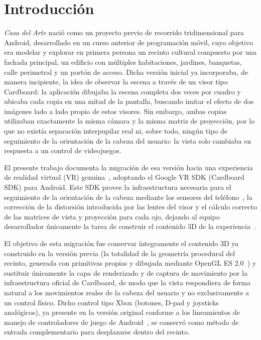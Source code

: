 \documentclass[conference]{IEEEtran}
\begin{document}
	\section{Introducción}
	\textit{Casa del Arte} nació como un proyecto previo de recorrido tridimensional para Android, desarrollado en un curso anterior de programación móvil, cuyo objetivo era modelar y explorar en primera persona un recinto cultural compuesto por una fachada principal, un edificio con múltiples habitaciones, jardines, banquetas, calle perimetral y un portón de acceso. Dicha versión inicial ya incorporaba, de manera incipiente, la idea de observar la escena a través de un visor tipo Cardboard: la aplicación dibujaba la escena completa dos veces por cuadro y ubicaba cada copia en una mitad de la pantalla, buscando imitar el efecto de dos imágenes lado a lado propio de estos visores. Sin embargo, ambas copias utilizaban exactamente la misma cámara y la misma matriz de proyección, por lo que no existía separación interpupilar real ni, sobre todo, ningún tipo de seguimiento de la orientación de la cabeza del usuario: la vista solo cambiaba en respuesta a un control de videojuegos.
	
	El presente trabajo documenta la migración de esa versión hacia una experiencia de realidad virtual (VR) genuina~\cite{sherman2018understanding}, adoptando el Google VR SDK (Cardboard SDK) para Android. Este SDK provee la infraestructura necesaria para el seguimiento de la orientación de la cabeza mediante los sensores del teléfono~\cite{lavalle2023vr,android2024motionsensors}, la corrección de la distorsión introducida por las lentes del visor y el cálculo correcto de las matrices de vista y proyección para cada ojo, dejando al equipo desarrollador únicamente la tarea de construir el contenido 3D de la experiencia~\cite{googlecardboardsdk}.
	
	El objetivo de esta migración fue conservar íntegramente el contenido 3D ya construido en la versión previa (la totalidad de la geometría procedural del recinto, generada con primitivas propias y dibujada mediante OpenGL ES 2.0~\cite{khronosopengles,androidopenglprimer,khronos2010gles2}) y sustituir únicamente la capa de renderizado y de captura de movimiento por la infraestructura oficial de Cardboard, de modo que la vista respondiera de forma natural a los movimientos reales de la cabeza del usuario y no exclusivamente a un control físico. Dicho control tipo Xbox (botones, D-pad y joysticks analógicos), ya presente en la versión original conforme a los lineamientos de manejo de controladores de juego de Android~\cite{androidgamecontrollers}, se conservó como método de entrada complementario para desplazarse dentro del recinto.
	
\end{document}

